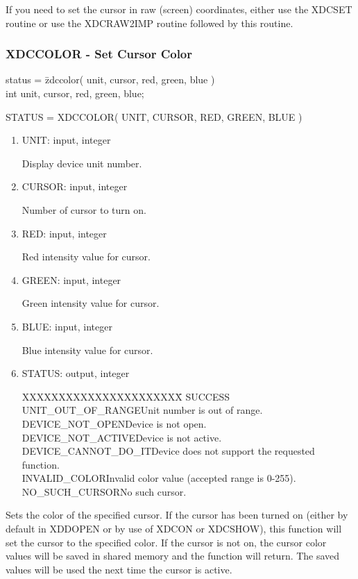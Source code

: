If you need to set the cursor in raw (screen) coordinates, either
use the XDCSET routine or use the XDCRAW2IMP routine followed by
this routine.
\newpage
\subsubsection{XDCCOLOR - Set Cursor Color}
\begin{tabbing}
status = \=zdccolor( unit, cursor, red, green, blue )\\
\>int  unit, cursor, red, green, blue;\\
\end{tabbing}
STATUS = XDCCOLOR( UNIT, CURSOR, RED, GREEN, BLUE )
\begin{enumerate}
\item UNIT:  input, integer

Display device unit number.
\item CURSOR:  input, integer

Number of cursor to turn on.
\item RED:  input, integer

Red intensity value for cursor.
\item GREEN:  input, integer

Green intensity value for cursor.
\item BLUE:  input, integer

Blue intensity value for cursor.
\item STATUS:  output, integer
\begin{tabbing}
XXXXXXXXXXXXXXXXXXXXXX\=\kill
SUCCESS\\
UNIT\_OUT\_OF\_RANGE\>Unit number is out of range.\\
DEVICE\_NOT\_OPEN\>Device is not open.\\
DEVICE\_NOT\_ACTIVE\>Device is not active.\\
DEVICE\_CANNOT\_DO\_IT\>Device does not support the requested function.\\
INVALID\_COLOR\>Invalid color value (accepted range is 0-255).\\
NO\_SUCH\_CURSOR\>No such cursor.\\
\end{tabbing}
\end{enumerate}
Sets the color of the specified cursor.  If the cursor has been turned
on (either by default in XDDOPEN or by use of XDCON or XDCSHOW), this
function will set the cursor to the specified color.  If the cursor
is not on, the cursor color values will be saved in shared memory and
the function will return.  The saved values will be used the next time
the cursor is active.
\newpage
